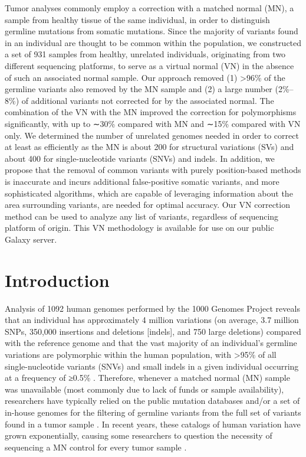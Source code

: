 Tumor analyses commonly employ a correction with a matched normal (MN), a sample from healthy tissue of the same individual, in order to distinguish germline mutations from somatic mutations. Since the majority of variants found in an individual are thought to be common within the population, we constructed a set of 931 samples from healthy, unrelated individuals, originating from two different sequencing platforms, to serve as a virtual normal (VN) in the absence of such an associated normal sample. Our approach removed (1) >96\% of the germline variants also removed by the MN sample and (2) a large number (2\%–8\%) of additional variants not corrected for by the associated normal. The combination of the VN with the MN improved the correction for polymorphisms significantly, with up to ∼30\% compared with MN and ∼15\% compared with VN only. We determined the number of unrelated genomes needed in order to correct at least as efficiently as the MN is about 200 for structural variations (SVs) and about 400 for single-nucleotide variants (SNVs) and indels. In addition, we propose that the removal of common variants with purely position-based methods is inaccurate and incurs additional false-positive somatic variants, and more sophisticated algorithms, which are capable of leveraging information about the area surrounding variants, are needed for optimal accuracy. Our VN correction method can be used to analyze any list of variants, regardless of sequencing platform of origin. This VN methodology is available for use on our public Galaxy server.

\section*{Introduction}

Analysis of 1092 human genomes performed by the 1000 Genomes Project reveals that an individual has approximately 4 million variations (on average, 3.7 million SNPs, 350,000 insertions and deletions [indels], and 750 large deletions) compared with the reference genome and that the vast majority of an individual's germline variations are polymorphic within the human population, with >95\% of all single-nucleotide variants (SNVs) and small indels in a given individual occurring at a frequency of ≥0.5\% \cite{10002010map,10002012integrated}. Therefore, whenever a matched normal (MN) sample was unavailable (most commonly due to lack of funds or sample availability), researchers have typically relied on the public mutation databases and/or a set of in-house genomes for the filtering of germline variants from the full set of variants found in a tumor sample \cite{yoon2009sensitive,kumar2011exome}. In recent years, these catalogs of human variation have grown exponentially, causing some researchers to question the necessity of sequencing a MN control for every tumor sample \cite{kumar2011exome}.

